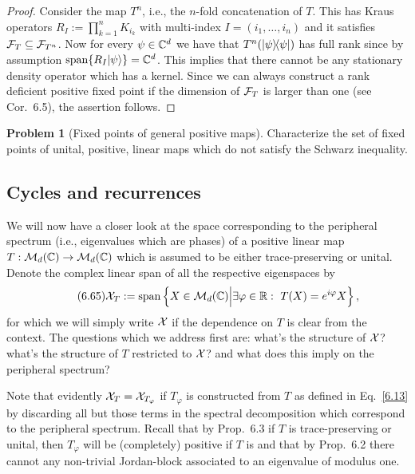\documentclass[11pt,a4paper]{article}
\theoremstyle{plain}
\theoremstyle{definition}
\newtheorem{problem}{Problem} %
\theoremstyle{remark}
\begin{document}
\begin{proof}
    Consider the map $T^n$, i.e., the $n$-fold concatenation of $T$. This has Kraus
    operators $R_I:=\prod_{k=1}^n K_{i_k}$ with multi-index $I=(i_1,\dots,i_n)$ and it
    satisfies $\mathcal{F}_T\subseteq \mathcal{F}_{T^n}$. Now for every $\psi\in\mathbb{C}^d$ we have that
    $T^n(|\psi\rangle\!\langle\psi|)$ has full rank since by assumption
    $\operatorname{span}\{R_I|\psi\rangle\}=\mathbb{C}^d$. This implies that there cannot be any stationary
    density operator which has a kernel. Since we can always construct a rank deficient
    positive fixed point if the dimension of $\mathcal{F}_T$ is larger than one (see Cor.~6.5),
    the assertion follows.
\end{proof}

\begin{problem}[Fixed points of general positive maps]
Characterize the set of fixed points of unital, positive, linear maps which do
not satisfy the Schwarz inequality.
\end{problem}

\subsection{Cycles and recurrences}

We will now have a closer look at the space corresponding to the peripheral
spectrum (i.e., eigenvalues which are phases) of a positive linear map
$T:\mathcal{M}_d(\mathbb{C})\to\mathcal{M}_d(\mathbb{C})$ which is assumed to be either trace-preserving or
unital. Denote the complex linear span of all the respective eigenspaces by
\begin{equation}\tag{6.65}
    \XT := \spn\left\{X\in\mcM_d(\CC) \Big| \exists \varphi\in\RR:\ T(X)=e^{i\varphi}X\right\},
\end{equation}
for which we will simply write $\mathcal{X}$ if the dependence on $T$ is clear from the
context. The questions which we address first are: what's the structure of
$\mathcal{X}$? what's the structure of $T$ restricted to $\mathcal{X}$? and what does this
imply on the peripheral spectrum?

Note that evidently $\mathcal{X}_T=\mathcal{X}_{T_\varphi}$ if $T_\varphi$ is constructed from $T$
as defined in Eq.~\eqref{6.13} by discarding all but those terms in the spectral
decomposition which correspond to the peripheral spectrum. Recall that by
Prop.~6.3 if $T$ is trace-preserving or unital, then $T_\varphi$ will be
(completely) positive if $T$ is and that by Prop.~6.2 there cannot any non-trivial
Jordan-block associated to an eigenvalue of modulus one.
\end{document}

